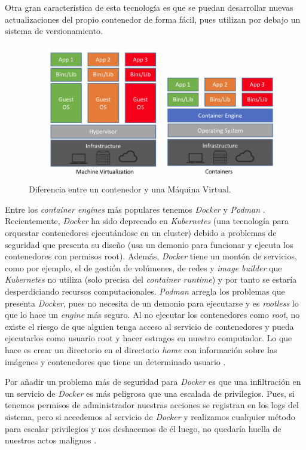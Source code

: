 Otra gran característica de esta tecnología es que se puedan desarrollar nuevas actualizaciones del propio contenedor de forma fácil, pues utilizan por debajo un sistema de versionamiento.

\begin{figure}[H]
	\includegraphics[scale=0.3]{imagenes/03_Estado_del_arte/containers.png}
	\centering
	\caption{Diferencia entre un contenedor y una Máquina Virtual.}
\end{figure}

Entre los \textit{container engines} más populares tenemos \textit{Docker} \cite{docker} y \textit{Podman} \cite{podman}. Recientemente, \textit{Docker} ha sido deprecado en \textit{Kubernetes} (una tecnología para orquestar contenedores ejecutándose en un cluster) debido a problemas de seguridad que presenta su diseño (usa un demonio para funcionar y ejecuta los contenedores con permisos root). Además, \textit{Docker} tiene un montón de servicios, como por ejemplo, el de gestión de volúmenes, de redes y \textit{image builder} que \textit{Kubernetes} no utiliza (solo precisa del \textit{container runtime}) y por tanto se estaría desperdiciando recursos computacionales. \textit{Podman} arregla los problemas que presenta \textit{Docker}, pues no necesita de un demonio para ejecutarse y es \textit{rootless} lo que lo hace un \textit{engine} más seguro. Al no ejecutar los contenedores como \textit{root}, no existe el riesgo de que alguien tenga acceso al servicio de contenedores y pueda ejecutarlos como usuario root y hacer estragos en nuestro computador. Lo que hace es crear un directorio en el directorio \textit{home} con información sobre las imágenes y contenedores que tiene un determinado usuario \cite{podmanvsdocker}.\newline

Por añadir un problema más de seguridad para \textit{Docker} es que una infiltración en un servicio de \textit{Docker} es más peligrosa que una escalada de privilegios. Pues, si tenemos permisos de administrador nuestras acciones se registran en los logs del sistema, pero si accedemos al servicio de \textit{Docker} y realizamos cualquier método para escalar privilegios y nos deshacemos de él luego, no quedaría huella de nuestros actos malignos \cite{podmanvsdocker}.

